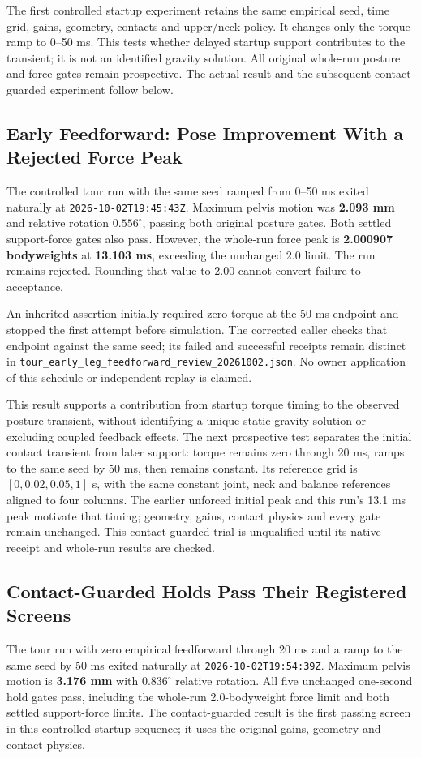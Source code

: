 \documentclass[11pt,a4paper]{article}
\begin{document}
The first controlled startup experiment retains the same empirical seed, time
grid, gains, geometry, contacts and upper/neck policy. It changes only
the torque ramp to 0--50 ms. This tests whether delayed startup support
contributes to the transient; it is not an identified gravity solution.
All original whole-run posture and force gates remain prospective.
The actual result and the subsequent contact-guarded experiment follow below.


\subsection{Early Feedforward: Pose Improvement With a Rejected Force Peak}
The controlled tour run with the same seed ramped from 0--50 ms exited
naturally at \texttt{2026-10-02T19:45:43Z}. Maximum pelvis motion was
\textbf{2.093 mm} and relative rotation \textbf{$0.556^\circ$}, passing
both original posture gates. Both settled support-force gates also pass.
However, the whole-run force peak is \textbf{2.000907 bodyweights} at
\textbf{13.103 ms}, exceeding the unchanged 2.0 limit. The run remains
rejected. Rounding that value to 2.00 cannot convert failure to acceptance.

An inherited assertion initially required zero torque at the 50 ms
endpoint and stopped the first attempt before simulation. The corrected
caller checks that endpoint against the same seed; its failed and successful
receipts remain distinct in
\texttt{tour\_early\_leg\_feedforward\_review\_20261002.json}.
No owner application of this schedule or independent replay is claimed.

This result supports a contribution from startup torque timing to the
observed posture transient, without identifying a unique static gravity
solution or excluding coupled feedback effects. The next prospective
test separates the initial contact transient from later support: torque
remains zero through 20 ms, ramps to the same seed by 50 ms, then remains
constant. Its reference grid is $[0,0.02,0.05,1]$ s, with the same
constant joint, neck and balance references aligned to four columns.
The earlier unforced initial peak and this run's 13.1 ms peak motivate
that timing; geometry, gains, contact physics and every gate remain
unchanged. This contact-guarded trial is unqualified until its native
receipt and whole-run results are checked.


\subsection{Contact-Guarded Holds Pass Their Registered Screens}
The tour run with zero empirical feedforward through 20 ms and a ramp
to the same seed by 50 ms exited naturally at
\texttt{2026-10-02T19:54:39Z}. Maximum pelvis motion is
\textbf{3.176 mm} with \textbf{$0.836^\circ$} relative rotation.
All five unchanged one-second hold gates pass, including the whole-run
2.0-bodyweight force limit and both settled support-force limits.
The contact-guarded result is the first passing screen in this controlled
startup sequence; it uses the original gains, geometry and contact physics.
\end{document}
